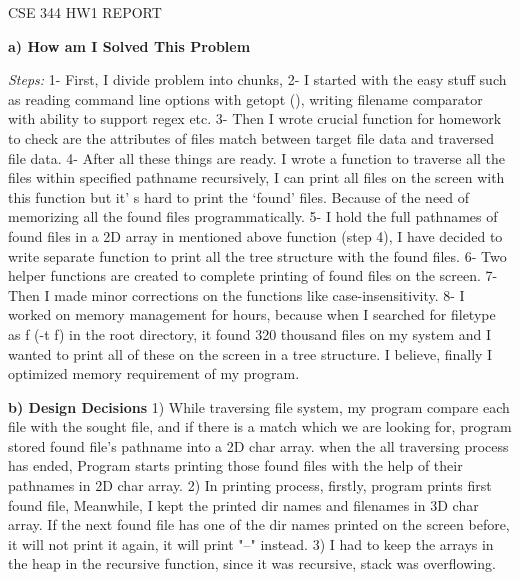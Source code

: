 \documentclass[14pt]{article}
\begin{document}
\begin{Center}
CSE 344 HW1 REPORT
\end{Center}

\vspace{\baselineskip}
{\fontsize{16pt}{19.2pt}\selectfont \textbf{a) How am I Solved This Problem}}

\vspace{\baselineskip}
\textit{Steps:}
1- First, I divide problem into chunks, 
2- I started with the easy stuff such as reading command line options with getopt (), writing filename comparator with ability to support regex etc.
3- Then I wrote crucial function for homework to check are the attributes of files match between target file data and traversed file data. 
4- After all these things are ready. I wrote a function to traverse all the files within specified pathname recursively, I can print all files on the screen with this function but it’ s hard to print the ‘found’ files. Because of the need of memorizing all the found files programmatically.
5- I hold the full pathnames of found files in a 2D array in mentioned above function (step 4), I have decided to write separate function to print all the tree structure with the found files.
6- Two helper functions are created to complete printing of found files on the screen.
7- Then I made minor corrections on the functions like case-insensitivity.
8- I worked on memory management for hours, because when I searched for filetype as f (-t f) in the root directory, it found 320 thousand files on my system and I wanted to print all of these on the screen in a tree structure. I believe, finally I optimized memory requirement of my program.

\vspace{\baselineskip}
{\fontsize{18pt}{21.6pt}\selectfont \textbf{b) Design Decisions}}
1) While traversing file system, my program compare each file with the sought file, and if there is a match which we are looking for, program stored found file’s pathname into a 2D char array. when the all traversing process has ended, Program starts printing those found files with the help of their pathnames in 2D char array.
2) In printing process, firstly, program prints first found file, Meanwhile, I kept the printed dir names and filenames in 3D char array. If the next found file has one of the dir names printed on the screen before, it will not print it again, it will print "--" instead.
3) I had to keep the arrays in the heap in the recursive function, since  it was recursive, stack was overflowing.
\end{document}
